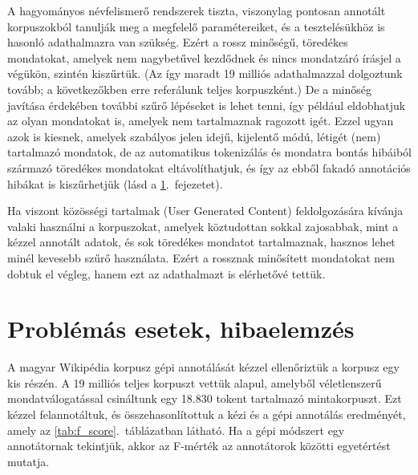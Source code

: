 \documentclass{llncs}
\begin{document}
A hagyományos névfelismerő rendszerek tiszta, viszonylag pontosan annotált korpuszokból tanulják meg a megfelelő paramétereiket, és a tesztelésükhöz is hasonló adathalmazra van szükség. Ezért a rossz minőségű, töredékes mondatokat, amelyek nem nagybetűvel kezdődnek és nincs mondatzáró írásjel a végükön, szintén kiszűrtük. (Az így maradt 19 milliós adathalmazzal dolgoztunk tovább; a következőkben erre referálunk teljes korpuszként.) De a minőség javítása érdekében további szűrő lépéseket is lehet tenni, így például eldobhatjuk az olyan mondatokat is, amelyek nem tartalmaznak ragozott igét. Ezzel ugyan azok is kiesnek, amelyek szabályos jelen idejű, kijelentő módú, létigét (nem) tartalmazó mondatok, de az automatikus tokenizálás és mondatra bontás hibáiból származó töredékes mondatokat eltávolíthatjuk, és így az ebből fakadó annotációs hibákat is kiszűrhetjük (lásd a \ref{probl}.~fejezetet). 

Ha viszont közösségi tartalmak (User Generated Content) feldolgozására kívánja valaki használni a korpuszokat, amelyek köztudottan sokkal zajosabbak, mint a kézzel annotált adatok, és sok töredékes mondatot tartalmaznak, hasznos lehet minél kevesebb szűrő használata. Ezért a rossznak minősített mondatokat nem dobtuk el végleg, hanem ezt az adathalmazt is elérhetővé tettük.

\section{Problémás esetek, hibaelemzés}
\label{probl}

A magyar Wikipédia korpusz gépi annotálását kézzel ellenőriztük a korpusz egy kis
részén. A 19 milliós teljes korpuszt vettük alapul, amelyből véletlenszerű
mondatválogatással csináltunk egy 18.830 tokent tartalmazó mintakorpuszt.
Ezt kézzel felannotáltuk, és összehasonlítottuk a kézi és a gépi annotálás
eredményét, amely az \ref{tab:f_score}.~táblázatban látható. Ha a gépi módszert egy annotátornak tekintjük, akkor az F-mérték az annotátorok közötti egyetértést mutatja.
\end{document}
